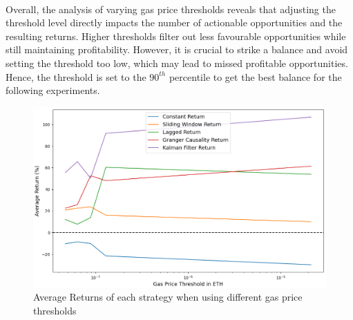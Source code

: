 \\[3mm]
Overall, the analysis of varying gas price thresholds reveals that adjusting the threshold level directly impacts the number of actionable opportunities and the resulting returns. Higher thresholds filter out less favourable opportunities while still maintaining profitability. However, it is crucial to strike a balance and avoid setting the threshold too low, which may lead to missed profitable opportunities. Hence, the threshold is set to the $90^{th}$ percentile to get the best balance for the following experiments.

\begin{figure}[H]
    \centering
    \includegraphics[width=\linewidth]{evaluation/Images/VaryGPThreshold.png}
    \caption{Average Returns of each strategy when using different gas price thresholds}
    \label{fig:VaryGasPriceThresholds}
\end{figure}

